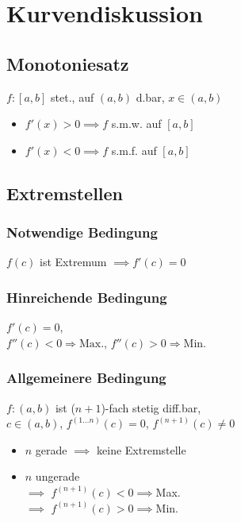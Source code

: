\section*{Kurvendiskussion}

\subsection*{Monotoniesatz}
$f: [a,b]$ stet., auf $(a,b)$ d.bar, $x\in(a,b)$
\begin{itemize}
	\item $f'(x)>0\implies f$ s.m.w. auf $[a,b]$
	\item $f'(x)<0\implies f$ s.m.f. auf $[a,b]$
\end{itemize}

\subsection*{Extremstellen}

\subsubsection*{Notwendige Bedingung}
$f(c)$ ist Extremum $\implies f'(c)=0$

\subsubsection*{Hinreichende Bedingung}
$f'(c)=0$,\\
$f''(c)<0\Rightarrow\text{Max.}$, $f''(c)>0\Rightarrow\text{Min.}$

\subsubsection*{Allgemeinere Bedingung}
$f:(a,b)$ ist ($n+1$)-fach stetig diff.bar, \\
$c\in(a,b)$, $f^{(1 \ldots n)}(c)=0$, $f^{(n+1)}(c)\neq0$
\begin{itemize}
	\item $n$ gerade $\implies$ keine Extremstelle
	\item $n$ ungerade\\
		$\implies$ $f^{(n+1)}(c)<0\implies$Max. \\
		$\implies$ $f^{(n+1)}(c)>0\implies$Min.
\end{itemize}
